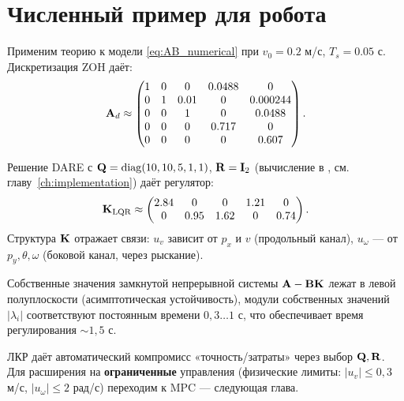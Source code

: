 \section{Численный пример для робота}
\label{sec:numerical_example}

Применим теорию к модели \eqref{eq:AB_numerical} при $v_0 = 0.2$ м/с,
$T_s = 0.05$ с. Дискретизация ZOH даёт:
\begin{equation*}
  \mathbf{A}_d \approx \begin{pmatrix}
    1 & 0 & 0 & 0.0488 & 0\\
    0 & 1 & 0.01 & 0 & 0.000244\\
    0 & 0 & 1 & 0 & 0.0488\\
    0 & 0 & 0 & 0.717 & 0\\
    0 & 0 & 0 & 0 & 0.607
  \end{pmatrix}.
\end{equation*}

Решение DARE с $\mathbf{Q} = \operatorname{diag}(10,10,5,1,1)$, $\mathbf{R} = \mathbf{I}_2$
(вычисление в , см. главу~\ref{ch:implementation})
даёт регулятор:
\begin{equation}
  \mathbf{K}_{\text{LQR}} \approx \begin{pmatrix}
    2.84 & 0 & 0 & 1.21 & 0\\
    0 & 0.95 & 1.62 & 0 & 0.74
  \end{pmatrix}.
  \label{eq:K_lqr_robot}
\end{equation}
Структура $\mathbf{K}$ отражает связи: $u_v$ зависит от $p_x$ и $v$
(продольный канал), $u_\omega$ --- от $p_y, \theta, \omega$
(боковой канал, через рыскание).

Собственные значения замкнутой непрерывной системы $\mathbf{A} - \mathbf{B}\mathbf{K}$
лежат в левой полуплоскости (асимптотическая устойчивость), модули собственных
значений $|\lambda_i|$ соответствуют постоянным времени $0{,}3\ldots 1$ с,
что обеспечивает время регулирования $\sim 1{,}5$ с.

\begin{notebox}
ЛКР даёт автоматический компромисс «точность/затраты» через выбор
$\mathbf{Q},\mathbf{R}$. Для расширения на \textbf{ограниченные} управления
(физические лимиты: $|u_v| \leq 0{,}3$ м/с, $|u_\omega| \leq 2$ рад/с)
переходим к MPC --- следующая глава.
\end{notebox}
